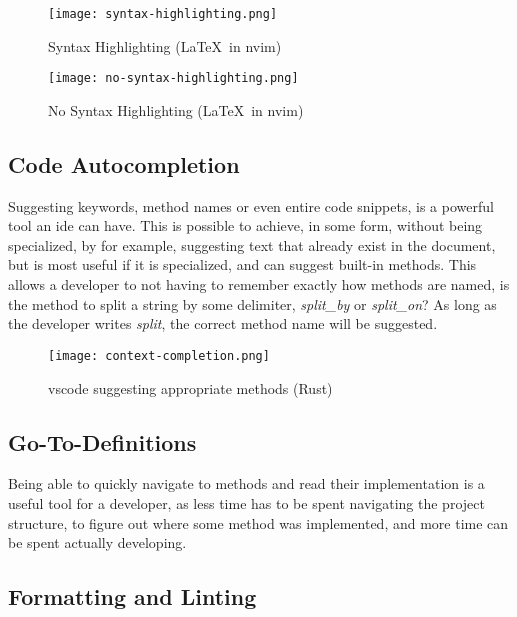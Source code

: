 \begin{figure}
  \centering
  \texttt{[image: syntax-highlighting.png]}
  \caption{Syntax Highlighting (\LaTeX\ in \gls{nvim})}
  \label{pic:stx}
\end{figure}

\begin{figure}
  \centering
  \texttt{[image: no-syntax-highlighting.png]}
  \caption{No Syntax Highlighting (\LaTeX\ in \gls{nvim})}
  \label{pic:noStx}
\end{figure}

\subsection{Code Autocompletion}

Suggesting keywords, method names or even entire code snippets, is a powerful
tool an \gls{ide} can have. This is possible to achieve, in some form, without
being specialized, by for example, suggesting text that already exist in the
document, but is most useful if it is specialized, and can suggest built-in
methods. This allows a developer to not having to remember exactly how methods
are named, is the method to split a string by some delimiter, \textit{split\_by}
or \textit{split\_on}? As long as the developer writes \textit{split}, the
correct method name will be suggested.

\begin{figure}
  \centering
  \texttt{[image: context-completion.png]}
  \caption{\gls{vscode} suggesting appropriate methods (Rust)}
  \label{pic:completion}
\end{figure}

\subsection{Go-To-Definitions}

Being able to quickly navigate to methods and read their implementation is a
useful tool for a developer, as less time has to be spent navigating the project
structure, to figure out where some method was implemented, and more time can be
spent actually developing.

\subsection{Formatting and Linting}

